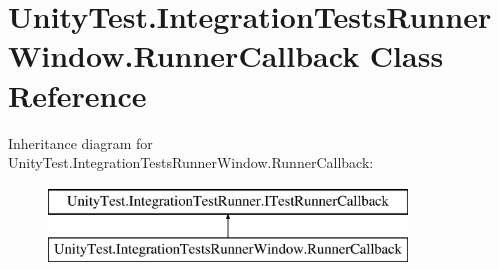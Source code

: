 \hypertarget{class_unity_test_1_1_integration_tests_runner_window_1_1_runner_callback}{}\section{Unity\+Test.\+Integration\+Tests\+Runner\+Window.\+Runner\+Callback Class Reference}
\label{class_unity_test_1_1_integration_tests_runner_window_1_1_runner_callback}
Inheritance diagram for Unity\+Test.\+Integration\+Tests\+Runner\+Window.\+Runner\+Callback\+:\begin{figure}[H]
\begin{center}
\leavevmode
\includegraphics[height=2.000000cm]{class_unity_test_1_1_integration_tests_runner_window_1_1_runner_callback}
\end{center}
\end{figure}

